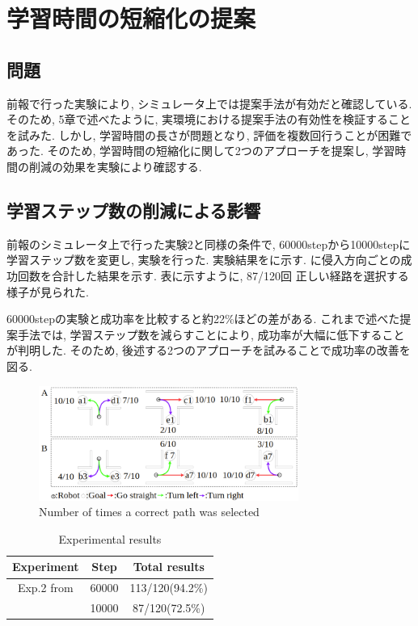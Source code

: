 \documentclass{jarticle}
\begin{document}
\section{学習時間の短縮化の提案}
\subsection{問題}
前報\cite{mech}で行った実験により, シミュレータ上では提案手法が有効だと確認している. そのため, 5章で述べたように, 実環境における提案手法の有効性を検証することを試みた. しかし, 学習時間の長さが問題となり, 評価を複数回行うことが困難であった. そのため, 学習時間の短縮化に関して2つのアプローチを提案し, 学習時間の削減の効果を実験により確認する.

\subsection{学習ステップ数の削減による影響}
前報\cite{mech}のシミュレータ上で行った実験2と同様の条件で, 60000stepから10000stepに学習ステップ数を変更し, 実験を行った.
実験結果をに示す. に侵入方向ごとの成功回数を合計した結果を示す.
表に示すように, 87/120回 正しい経路を選択する様子が見られた.
\par
60000stepの実験と成功率を比較すると約22\%ほどの差がある. これまで述べた提案手法では, 学習ステップ数を減らすことにより, 成功率が大幅に低下することが判明した. そのため, 後述する2つのアプローチを試みることで成功率の改善を図る.

\begin{figure}[h]
  \centering
   \includegraphics[width=85mm]{10000step.png}
   \vspace*{-4mm}
   \caption{Number of times a correct path was selected}
   \label{fig: fig9}
 \end{figure}

 \vspace{-8mm}

 \begin{table}[H]
  \caption{Experimental results}
  \label{tbl: table3}
  \centering
  \footnotesize
  \vspace{2mm}
  \begin{tabular}{|c|c|c|}
   \hline
   Experiment & Step & Total results \\\hline
   Exp.2 from \cite{mech} & 60000 & 113/120(94.2\%) \\ \cline{2-3}
  & 10000 & 87/120(72.5\%)\\
   \hline
  \end{tabular}
 \end{table}
\end{document}
